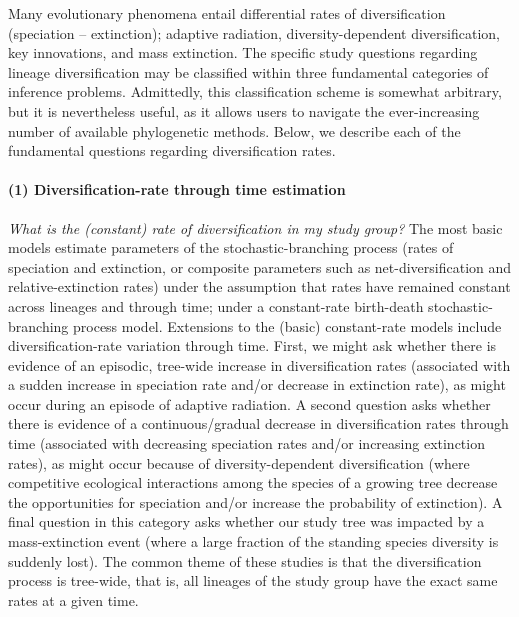 Many evolutionary phenomena entail differential rates of diversification (speciation -- extinction); \EG adaptive radiation, diversity-dependent diversification, key innovations, and mass extinction.
The specific study questions regarding lineage diversification may be classified within three fundamental categories of inference problems.
Admittedly, this classification scheme is somewhat arbitrary, but it is nevertheless useful, as it allows users to navigate the ever-increasing number of available phylogenetic methods.
Below, we describe each of the fundamental questions regarding diversification rates.

\paragraph{(1) Diversification-rate through time estimation}\textit{What is the (constant) rate of diversification in my study group?} 
The most basic models estimate parameters of the stochastic-branching process (\IE rates of speciation and extinction, or composite parameters such as net-diversification and relative-extinction rates) under the assumption that rates have remained constant across lineages and through time; \IE under a constant-rate birth-death stochastic-branching process model.
Extensions to the (basic) constant-rate models include diversification-rate variation through time.
First, we might ask whether there is evidence of an episodic, tree-wide increase in diversification rates (associated with a sudden increase in speciation rate and/or decrease in extinction rate), as might occur during an episode of adaptive radiation.
A second question asks whether there is evidence of a continuous/gradual decrease in diversification rates through time (associated with decreasing speciation rates and/or increasing extinction rates), as might occur because of diversity-dependent diversification (\IE where competitive ecological interactions among the species of a growing tree decrease the opportunities for speciation and/or increase the probability of extinction).
A final question in this category asks whether our study tree was impacted by a mass-extinction event (where a large fraction of the standing species diversity is suddenly lost).
The common theme of these studies is that the diversification process is tree-wide, that is, all lineages of the study group have the exact same rates at a given time.



